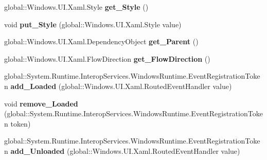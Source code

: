 \begin{DoxyCompactItemize}
global\+::\+Windows.\+U\+I.\+Xaml.\+Style {\bfseries get\+\_\+\+Style} ()
\item 
\mbox{\label{interface_windows_1_1_u_i_1_1_xaml_1_1_i_framework_element_ab113b23a88312132f12dd7ff37c23fc2}} 
void {\bfseries put\+\_\+\+Style} (global\+::\+Windows.\+U\+I.\+Xaml.\+Style value)
\item 
\mbox{\label{interface_windows_1_1_u_i_1_1_xaml_1_1_i_framework_element_a109f23b5d4ff91a61e010793e8f75ef6}} 
global\+::\+Windows.\+U\+I.\+Xaml.\+Dependency\+Object {\bfseries get\+\_\+\+Parent} ()
\item 
\mbox{\label{interface_windows_1_1_u_i_1_1_xaml_1_1_i_framework_element_a80c91718f267bfd344d25ca8701827ab}} 
global\+::\+Windows.\+U\+I.\+Xaml.\+Flow\+Direction {\bfseries get\+\_\+\+Flow\+Direction} ()
\item 
\mbox{\label{interface_windows_1_1_u_i_1_1_xaml_1_1_i_framework_element_a09af92bc5fcaa9a8925401ddcd75d36e}} 
global\+::\+System.\+Runtime.\+Interop\+Services.\+Windows\+Runtime.\+Event\+Registration\+Token {\bfseries add\+\_\+\+Loaded} (global\+::\+Windows.\+U\+I.\+Xaml.\+Routed\+Event\+Handler value)
\item 
\mbox{\label{interface_windows_1_1_u_i_1_1_xaml_1_1_i_framework_element_aafdb3efaeb2c040c7e5209bb37317e74}} 
void {\bfseries remove\+\_\+\+Loaded} (global\+::\+System.\+Runtime.\+Interop\+Services.\+Windows\+Runtime.\+Event\+Registration\+Token token)
\item 
\mbox{\label{interface_windows_1_1_u_i_1_1_xaml_1_1_i_framework_element_ad4ed2f244c6516761d641431768f021b}} 
global\+::\+System.\+Runtime.\+Interop\+Services.\+Windows\+Runtime.\+Event\+Registration\+Token {\bfseries add\+\_\+\+Unloaded} (global\+::\+Windows.\+U\+I.\+Xaml.\+Routed\+Event\+Handler value)
\item 
\mbox{\label{interface_windows_1_1_u_i_1_1_xaml_1_1_i_framework_element_a3289e30bb0249071801645260d266744}} 

\end{DoxyCompactItemize}
